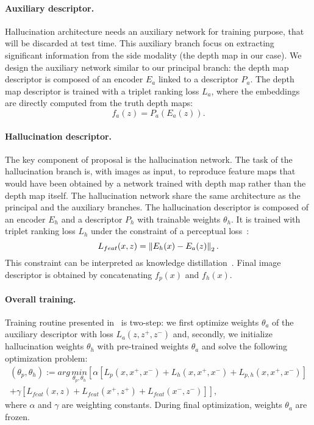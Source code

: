 \paragraph{Auxiliary descriptor.}
Hallucination architecture needs an auxiliary network for training purpose, that will be discarded at test time. This auxiliary branch focus on extracting significant information from the side modality (the depth map in our case). We design the auxiliary network similar to our principal branch: the depth map descriptor is composed of an encoder $E_a$ linked to a descriptor $P_a$. The depth map descriptor is trained with a triplet ranking loss $L_a$, where the embeddings are directly computed from the truth depth maps:
\begin{equation}
	f_a(z) = P_a(E_a(z)).
\end{equation}

\paragraph{Hallucination descriptor.} The key component of \citet{Hoffman2016} proposal is the hallucination network. The task of the hallucination branch is, with images as input, to reproduce feature maps that would have been obtained by a network trained with depth map rather than the depth map itself. The hallucination network share the same architecture as the principal and the auxiliary branches. The hallucination descriptor is composed of an encoder $E_h$ and a descriptor $P_h$ with trainable weights $\theta_h$. It is trained with triplet ranking loss $L_h$ under the constraint of a perceptual loss~\citep{Johnson2016}:
\begin{equation}
	\label{eq:perceptual_loss}
	L_{feat}(x, z) = \left\lVert E_h(x) - E_a(z)\right\rVert_2.
\end{equation}
This constraint can be interpreted as knowledge distillation~\citep{hinton2015distilling}. Final image descriptor is obtained by concatenating $f_p(x)$ and $f_h(x)$.

\paragraph{Overall training.} Training routine presented in~\citep{Hoffman2016} is two-step: we first optimize weights $\theta_a$ of the auxiliary descriptor with loss $L_a(z, z^+, z^-)$ and, secondly, we initialize hallucination weights $\theta_h$ with pre-trained weights $\theta_a$ and solve the following optimization problem:
\begin{multline}
	\label{eq:overall_hall_loss}
	\left( \theta_{p}, \theta_{h} \right) := arg\,\underset{\theta_p, \theta_h}{min} \left[ \alpha\left[ L_p(x, x^+, x^-) + L_h(x, x^+, x^-) + L_{p,h}(x, x^+, x^-) \right] \right. \\
	\left. + \gamma\left[ L_{feat}(x, z) + L_{feat}(x^+, z^+) + L_{feat}(x^-, z^-) \right] \right],
\end{multline}
where $\alpha$ and $\gamma$ are weighting constants. During final optimization, weights $\theta_a$ are frozen. 

